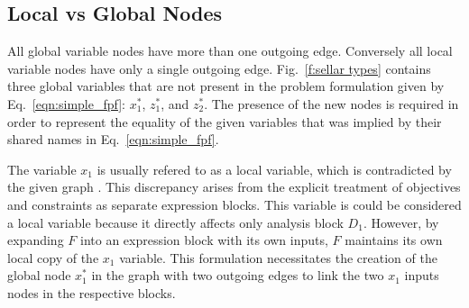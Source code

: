 
%
%

\subsection{Local vs Global Nodes }

  All global variable nodes have more than one outgoing edge. Conversely all local 
  variable nodes have only a single outgoing edge. Fig.~\ref{f:sellar types} contains 
  three global variables that are not present in the problem formulation given by 
  Eq.~\ref{eqn:simple_fpf}: $x_1^*$, $z_1^*$, and $z_2^*$. The presence of the 
  new nodes is required in order to represent the equality of the given variables that
  was implied by their shared names in Eq.~\ref{eqn:simple_fpf}. 

  The variable $x_1$ is usually refered to as a local variable, which is 
  contradicted by the given graph \cite{Sellar1996}. This discrepancy 
  arises from the explicit treatment of objectives and constraints as separate 
  expression blocks. This variable is could be considered a local 
  variable because it directly affects only analysis block $D_1$. However, by expanding
  $F$ into an expression block with its own inputs, $F$ maintains its own local 
  copy of the $x_1$ variable. This formulation necessitates the creation of the global 
  node $x_1^*$ in the graph with two outgoing edges to link the two $x_1$ inputs nodes 
  in the respective blocks. 

